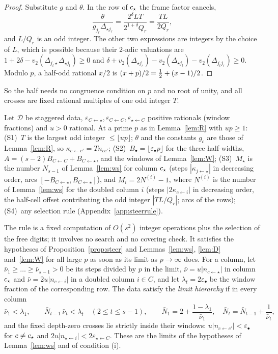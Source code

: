 \begin{proof}
Substitute $g$ and $\theta$. In the row of $c_{\star}$ the frame factor cancels,
\[
\frac{\theta}{g_{j_r}\Delta_{\star j_r}}=\frac{2^\delta LT}{2^{1+\delta}Q_r}=\frac{TL}{2Q_r},
\]
and $L/Q_r$ is an odd integer. The other two expressions are integers by the choice of $L$, which is possible because their $2$-adic valuations are $1+2\delta-v_2(\Delta_{j_t\star}\Delta_{\star j_t})\ge0$ and $\delta+v_2(\Delta_{\star j_r})-v_2(\Delta_{\star j_t})-v_2(\Delta_{j_tj_r})\ge0$. Modulo $p$, a half-odd rational $x/2$ is $(x+p)/2=\tfrac12+(x-1)/2$.
\end{proof}

So the half needs no congruence condition on $p$ and no root of unity, and all crosses are fixed rational multiples of one odd integer $T$.

\begin{definition}\label{def:BS}
Let $\mathcal D$ be staggered data, $\varepsilon_{C\leftarrow\star},\varepsilon_{C\leftarrow C},\varepsilon_{\star\leftarrow C}$ positive rationals (window fractions) and $u>0$ rational. At a prime $p$ as in Lemma~\ref{lem:R} with $up\ge1$:
(S1)~$T$ is the largest odd integer $\le\lfloor up\rfloor$; $\theta$ and the constants $g_c$ are those of Lemma~\ref{lem:R}, so $\kappa_{c\leftarrow c'}=Tn_{cc'}$;
(S2)~$B_\bullet=\lfloor\varepsilon_\bullet p\rfloor$ for the three half-widths, $A=(s-2)B_{C\leftarrow C}+B_{C\leftarrow\star}$, and the windows of Lemma~\ref{lem:W};
(S3)~$M_\star$ is the number $N_{s-1}$ of Lemma~\ref{lem:ws} for column $c_{\star}$ (steps $|\kappa_{j\leftarrow\star}|$ in decreasing order, arcs $[-B_{C\leftarrow\star},B_{C\leftarrow\star}]$), and $M_i=2N^{(i)}-1$, where $N^{(i)}$ is the number of Lemma~\ref{lem:ws} for the doubled column $i$ (steps $|2\kappa_{c\leftarrow i}|$ in decreasing order, the half-cell offset contributing the odd integer $|TL/Q_r|$; arcs of the rows);
(S4)~any selection rule (Appendix~\ref{app:steerrule}).
\end{definition}

The rule is a fixed computation of $O(s^2)$ integer operations plus the selection of the free digits; it involves no search and no covering check. It satisfies the hypotheses of Proposition~\ref{prop:steer} and Lemmas~\ref{lem:ws}, \ref{lem:D} and~\ref{lem:W} for all large $p$ as soon as its limit as $p\to\infty$ does. For a column, let $\bar\nu_1\ge\dots\ge\bar\nu_{s-1}>0$ be its steps divided by $p$ in the limit, $\bar\nu=u|n_{c\leftarrow\star}|$ in column $c_{\star}$ and $\bar\nu=2u|n_{c\leftarrow i}|$ in a doubled column $i\in C$, and let $\lambda_t=2\varepsilon_\bullet$ be the window fraction of the corresponding row. The data satisfy the \emph{limit hierarchy} if in every column
\[
\bar\nu_1<\lambda_1,\qquad \bar N_{t-1}\,\bar\nu_t<\lambda_t\quad(2\le t\le s-1),\qquad \bar N_1=2+\frac{1-\lambda_1}{\bar\nu_1},\quad \bar N_t=\bar N_{t-1}+\frac1{\bar\nu_t},
\]
and the fixed depth-zero crosses lie strictly inside their windows: $u|n_{c\leftarrow c'}|<\varepsilon_\bullet$ for $c\ne c_{\star}$ and $2u|n_{\star\leftarrow i}|<2\varepsilon_{\star\leftarrow C}$. These are the limits of the hypotheses of Lemma~\ref{lem:ws} and of condition (i).

